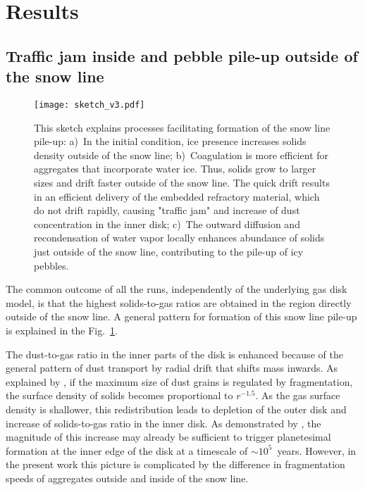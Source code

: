 \documentclass{aa}
\begin{document}
\section{Results}\label{sub:results}

\subsection{Traffic jam inside and pebble pile-up outside of the snow line}

\begin{figure}
   \centering
   \texttt{[image: sketch\_v3.pdf]}
      \caption{This sketch explains processes facilitating formation of the snow line pile-up: a)~In the initial condition, ice presence increases solids density outside of the snow line; b)~Coagulation is more efficient for aggregates that incorporate water ice. Thus, solids grow to larger sizes and drift faster outside of the snow line. The quick drift results in an efficient delivery of the embedded refractory material, which do not drift rapidly, causing "traffic jam" and increase of dust concentration in the inner disk; c)~The outward diffusion and recondensation of water vapor locally enhances abundance of solids just outside of the snow line, contributing to the pile-up of icy pebbles.}
      \label{fig:sketch}
\end{figure}

The common outcome of all the runs, independently of the underlying gas disk model, is that the highest solids-to-gas ratios are obtained in the region directly outside of the snow line. A general pattern for formation of this snow line pile-up is explained in the Fig.~\ref{fig:sketch}.

The dust-to-gas ratio in the inner parts of the disk is enhanced because of the general pattern of dust transport by radial drift that shifts mass inwards. As explained by \citet{2012A&A...539A.148B}, if the maximum size of dust grains is regulated by fragmentation, the surface density of solids becomes proportional to $r^{-1.5}$. As the gas surface density is shallower, this redistribution leads to depletion of the outer disk and increase of solids-to-gas ratio in the inner disk. As demonstrated by \citet{2016A&A...594A.105D}, the magnitude of this increase may already be sufficient to trigger planetesimal formation at the inner edge of the disk at a timescale of $\sim10^5$~years. However, in the present work this picture is complicated by the difference in fragmentation speeds of aggregates outside and inside of the snow line.
\end{document}
